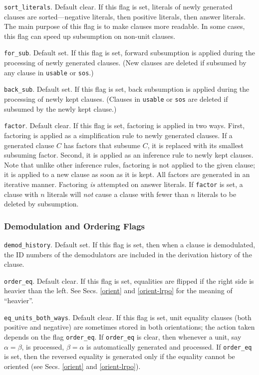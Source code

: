 \documentclass[11pt]{article}
\begin{document}
\noindent
\verb:sort_literals:.  Default clear.  If this flag is set,
literals of newly generated clauses are sorted---negative
literals, then positive literals, then answer literals.
The main purpose of this flag is to make clauses more readable.
In some cases, this flag can speed up subsumption on non-unit clauses.

\noindent
\verb:for_sub:.  Default set.  If this flag is set, forward
subsumption is applied during the processing of newly generated clauses.
(New clauses are deleted if subsumed by any clause
in \verb:usable: or \verb:sos:.)

\noindent
\verb:back_sub:.  Default set.  If this flag is set,
back subsumption is applied during the processing of newly kept clauses.
(Clauses in \verb:usable: or \verb:sos: are deleted if subsumed
by the newly kept clause.)

\noindent
\verb:factor:.  Default clear.  If this flag is set, factoring is
applied in two ways.
First, factoring is applied as a simplification rule
to newly generated clauses.  If a generated clause $C$ has factors
that subsume $C$, it is replaced with its smallest subsuming factor.
Second, it is applied as an inference rule to newly kept clauses.
Note that unlike other inference rules, factoring is
not applied to the given clause; it is applied to a new clause as
soon as it is kept.  All factors are generated in an iterative manner.
Factoring {\em is} attempted on answer literals.  If \verb:factor: is
set, a clause with $n$ literals will {\em not} cause a clause with fewer
than $n$ literals to be deleted by subsumption.

\subsubsection{Demodulation and Ordering Flags} \label{eq-flags}

\verb:demod_history:.  Default set.  If this flag is set, then when
a clause is demodulated, the ID numbers of the demodulators are included
in the derivation history of the clause.

\noindent
\verb:order_eq:.  Default clear.  If this flag is set,
equalities are flipped if the right side is heavier than the left.
See Secs. \ref{orient} and \ref{orient-lrpo} for the meaning of ``heavier''.

\noindent
\verb:eq_units_both_ways:.  Default clear.
If this flag is set, unit equality clauses
(both positive and negative)
are sometimes stored in both orientations; the action taken depends
on the flag \verb:order_eq:.
If \verb:order_eq: is clear, then whenever a unit, say $\alpha=\beta$,
is processed, $\beta=\alpha$ is automatically generated and processed.
If \verb:order_eq: is set, then the reversed equality is generated only if
the equality cannot be oriented (see Secs. \ref{orient} and \ref{orient-lrpo}).
\end{document}
